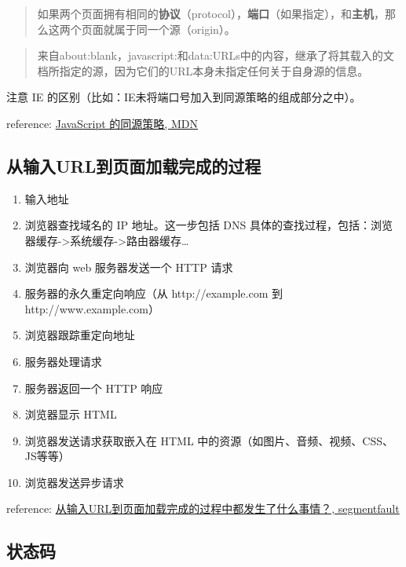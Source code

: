\begin{quote}
如果两个页面拥有相同的\textbf{协议}（protocol），\textbf{端口}（如果指定），和\textbf{主机}，那么这两个页面就属于同一个源（origin）。
\end{quote}

\begin{quote}
来自about:blank，javascript:和data:URLs中的内容，继承了将其载入的文档所指定的源，因为它们的URL本身未指定任何关于自身源的信息。
\end{quote}

注意 IE 的区别（比如：IE未将端口号加入到同源策略的组成部分之中）。

reference:
\href{https://developer.mozilla.org/zh-CN/docs/Web/Security/Same-origin_policy}{JavaScript
的同源策略, MDN}

\subsection{从输入URL到页面加载完成的过程}\label{ux4eceux8f93ux5165urlux5230ux9875ux9762ux52a0ux8f7dux5b8cux6210ux7684ux8fc7ux7a0b}

\begin{enumerate}
\def\labelenumi{\arabic{enumi}.}
\tightlist
\item
  输入地址
\item
  浏览器查找域名的 IP 地址。这一步包括 DNS
  具体的查找过程，包括：浏览器缓存-\textgreater{}系统缓存-\textgreater{}路由器缓存\ldots{}
\item
  浏览器向 web 服务器发送一个 HTTP 请求
\item
  服务器的永久重定向响应（从 http://example.com 到
  http://www.example.com）
\item
  浏览器跟踪重定向地址
\item
  服务器处理请求
\item
  服务器返回一个 HTTP 响应
\item
  浏览器显示 HTML
\item
  浏览器发送请求获取嵌入在 HTML
  中的资源（如图片、音频、视频、CSS、JS等等）
\item
  浏览器发送异步请求
\end{enumerate}

reference:
\href{http://segmentfault.com/q/1010000000489803/a-1020000000489830}{从输入URL到页面加载完成的过程中都发生了什么事情？,
segmentfault}

\subsection{状态码}\label{ux72b6ux6001ux7801}

